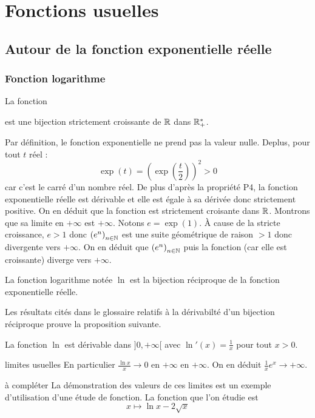 \section{Fonctions usuelles}
\subsection{Autour de la fonction exponentielle réelle}
\subsubsection{Fonction logarithme}
\begin{prop}
 La fonction   est une bijection strictement croissante de $\mathbb{R}$ dans $\mathbb{R}_+^*$.
\end{prop}
\begin{demo}
Par définition, le fonction exponentielle ne prend pas la valeur nulle. Deplus, pour tout $t$ réel :
\begin{displaymath}
 \exp(t)=(\exp(\dfrac{t}{2}))^2>0
\end{displaymath}
car c'est le carré d'un nombre réel. De plus d'après la propriété P4, la fonction exponentielle réelle est dérivable et elle est égale à sa dérivée donc strictement positive. On en déduit que la fonction est strictement croisante dans $\mathbb{R}$. Montrons que sa limite en $+\infty$ est $+\infty$. Notons $e=\exp(1)$. \`A cause de la stricte croissance, $e>1$ donc $\left(e^n \right)_{n\in\mathbb{N}}$ est une suite géométrique de raison $>1$ donc divergente vers $+\infty$. On en déduit que 
$\left(e^n \right)_{n\in\mathbb{N}}$ puis la fonction (car elle est croissante) diverge vers $+\infty$.
\end{demo}

\begin{defi}
La fonction logarithme notée $\ln$ est la bijection réciproque de la fonction exponentielle réelle.
\end{defi}
Les résultats cités dans le glossaire relatifs à la dérivabilté d'un bijection réciproque prouve la proposition suivante.
\begin{prop}
 La fonction $\ln$ est dérivable dans $]0,+\infty[$ avec $\ln'(x)=\frac{1}{x}$ pour tout $x>0$.
\end{prop}

limites usuelles 
En particulier $\frac{\ln x}{x}\rightarrow 0$ en $+\infty$ en $+\infty$. On en déduit $\frac{1}{x}e^x\rightarrow +\infty$.
\begin{demo} à compléter
  La démonstration des valeurs de ces limites est un exemple d'utilisation d'une étude de fonction. La fonction que l'on étudie est 
  \begin{displaymath}
    x \mapsto \ln x - 2\sqrt{x}
  \end{displaymath}
\end{demo}

